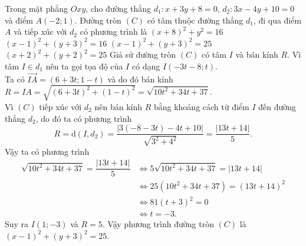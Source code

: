 \begin{ex}%
Trong mặt phẳng $Oxy$, cho đường thẳng $d_1\colon x+3y+8=0$, $d_2\colon 3x-4y+10=0$ và điểm $A\left(-2;1\right)$. Đường tròn $\left(C\right)$ có tâm thuộc đường thẳng $d_1$, đi qua điểm $A$ và tiếp xúc với $d_2$ có phương trình là
\choice
{$\left(x+8\right)^2+ y^2 = 16$}
{$\left(x-1\right)^2+\left(y+3\right)^2 = 16$}
{\True $\left(x-1\right)^2+\left(y+3\right)^2 = 25$}
{$\left(x+2\right)^2+\left(y+2\right)^2 =25$}
\loigiai
{
Giả sử đường tròn $\left(C\right)$ có tâm $I$ và bán kính $R$.
Vì tâm $I\in d_1$ nên ta gọi tọa độ của $I$ có dạng $I(-3t-8;t)$. \\
Ta có $\overrightarrow{IA} = \left(6+3t;1-t\right)$ và do đó bán kính $R = IA = \sqrt{\left(6+3t\right)^2 + (1-t)^2} = \sqrt{10t^2 + 34t + 37}$.\\
Vì $\left(C\right)$ tiếp xúc với $d_2$ nên bán kính $R$ bằng khoảng cách từ điểm $I$ đến đường thẳng $d_2$, do đó ta có phương trình
\[R = \mathrm{d}\left(I,d_2\right) = \dfrac{\left|3\left(-8-3t\right)-4t+10\right|}{ \sqrt{3^2+4^2}} = \dfrac{\left|13t + 14\right|}{5}.\]
Vậy ta có phương trình 
\[\begin{aligned}
\sqrt{10t^2 + 34t + 37} = \dfrac{\left|13t + 14\right|}{5} &\Leftrightarrow 5\sqrt{10t^2 + 34t + 37} = \left|13t + 14\right|\\
&\Leftrightarrow 25\left(10t^2 + 34t + 37\right) = \left(13t + 14\right)^2 \\
&\Leftrightarrow 81\left(t+3\right)^2 = 0 \\
&\Leftrightarrow t=-3 .
\end{aligned}\]
Suy ra $I\left(1;-3\right)$ và $R = 5$. Vậy phương trình đường tròn $\left(C\right)$ là $\left(x-1\right)^2+\left(y+3\right)^2 = 25$.
}
\end{ex}

